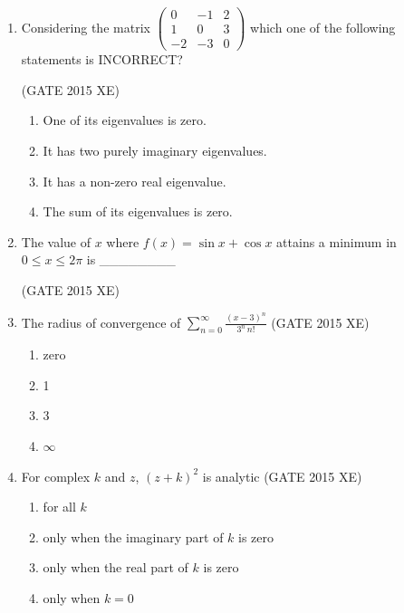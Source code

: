 \documentclass[journal,12pt,onecolumn]{IEEEtran}
\newcommand{\myvec}[1]{\begin{pmatrix}#1\end{pmatrix}}
\begin{document}
\begin{enumerate}

\item Considering the matrix
$\myvec{ 0 & -1 & 2 \\ 1 & 0 & 3 \\ -2 & -3 & 0}$
which one of the following statements is INCORRECT?

\hfill{(GATE 2015 XE)} \\
\begin{multicols}{2}
\begin{enumerate}
\item One of its eigenvalues is zero.
\item It has two purely imaginary eigenvalues.
\item It has a non-zero real eigenvalue.
\item The sum of its eigenvalues is zero.
\end{enumerate}
\end{multicols}



\item The value of $x$ where $f(x) = \sin{x} + \cos{x}$ attains a minimum in $0 \le x \le 2\pi$ is \_\_\_\_\_\_\_\_

\hfill{(GATE 2015 XE)} \\

\item The radius of convergence of $\sum_{n=0}^\infty \frac{(x-3)^n}{3^n\,n!}$  
\hfill{(GATE 2015 XE)} \\

\begin{multicols}{4}
\begin{enumerate}
\item zero
\item 1
\item 3
\item $\infty$
\end{enumerate}
\end{multicols}

\item For complex $k$ and $z$, $(z+k)^2$ is analytic  
\hfill{(GATE 2015 XE)} \\

\begin{multicols}{4}
\begin{enumerate}
\item for all $k$
\item only when the imaginary part of $k$ is zero
\item only when the real part of $k$ is zero
\item only when $k=0$
\end{enumerate}
\end{multicols}


\end{enumerate}
\end{document}
